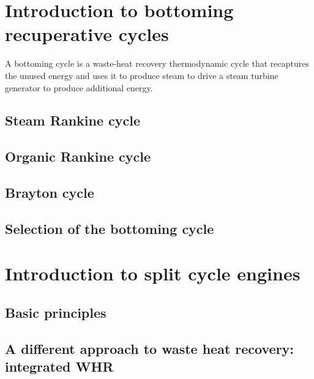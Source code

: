 \section{Introduction to bottoming recuperative cycles}

A bottoming cycle is a waste-heat recovery thermodynamic cycle that recaptures the unused energy and uses it to produce steam to drive a steam turbine generator to produce additional energy.



\subsection{Steam Rankine cycle}

\subsection{Organic Rankine cycle}

\subsection{Brayton cycle}

\subsection{Selection of the bottoming cycle}

\section{Introduction to split cycle engines}

\subsection{Basic principles}

\subsection{A different approach to waste heat recovery: integrated WHR}



